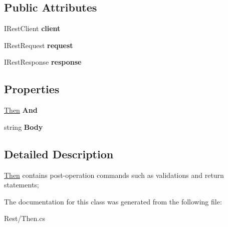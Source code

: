 \subsection*{Public Attributes}
\begin{DoxyCompactItemize}
\item 
\hypertarget{class_proto_test_1_1_golem_1_1_rest_1_1_then_a29c88e93e85292d8f20d0fb34d9f3f13}{I\-Rest\-Client {\bfseries client}}\label{class_proto_test_1_1_golem_1_1_rest_1_1_then_a29c88e93e85292d8f20d0fb34d9f3f13}

\item 
\hypertarget{class_proto_test_1_1_golem_1_1_rest_1_1_then_abb3e799d4a158cb7f101d268188295ae}{I\-Rest\-Request {\bfseries request}}\label{class_proto_test_1_1_golem_1_1_rest_1_1_then_abb3e799d4a158cb7f101d268188295ae}

\item 
\hypertarget{class_proto_test_1_1_golem_1_1_rest_1_1_then_ad742e34df8b079ea069168f7ffee70eb}{I\-Rest\-Response {\bfseries response}}\label{class_proto_test_1_1_golem_1_1_rest_1_1_then_ad742e34df8b079ea069168f7ffee70eb}

\end{DoxyCompactItemize}
\subsection*{Properties}
\begin{DoxyCompactItemize}
\item 
\hypertarget{class_proto_test_1_1_golem_1_1_rest_1_1_then_aaf0e508998618e6c1dc2ea63f703228e}{\hyperlink{class_proto_test_1_1_golem_1_1_rest_1_1_then}{Then} {\bfseries And}}\label{class_proto_test_1_1_golem_1_1_rest_1_1_then_aaf0e508998618e6c1dc2ea63f703228e}

\item 
\hypertarget{class_proto_test_1_1_golem_1_1_rest_1_1_then_aae4b8c5a3a0741dc290723d187b3bf42}{string {\bfseries Body}}\label{class_proto_test_1_1_golem_1_1_rest_1_1_then_aae4b8c5a3a0741dc290723d187b3bf42}

\end{DoxyCompactItemize}


\subsection{Detailed Description}
\hyperlink{class_proto_test_1_1_golem_1_1_rest_1_1_then}{Then} contains post-\/operation commands such as validations and return statements; 



The documentation for this class was generated from the following file\-:\begin{DoxyCompactItemize}
\item 
Rest/Then.\-cs\end{DoxyCompactItemize}
